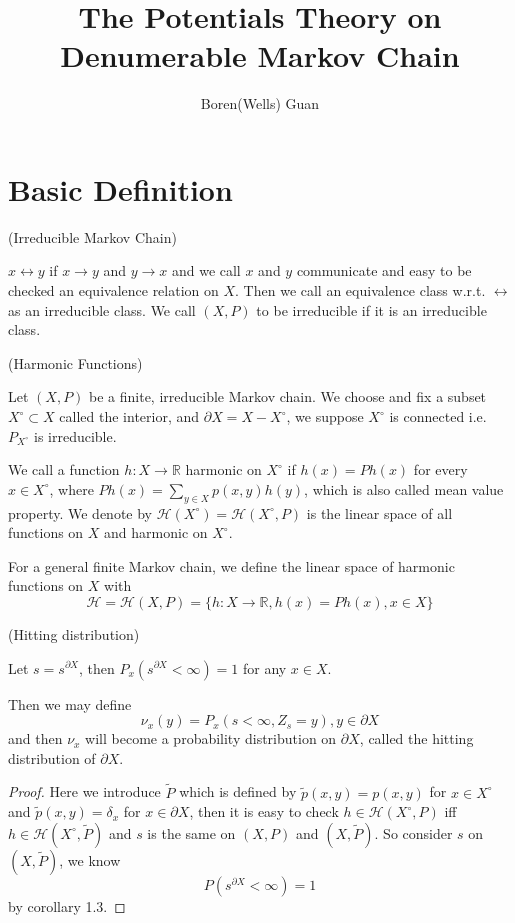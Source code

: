 \documentclass[lang=en,11pt,a4paper,citestyle =authoryear]{elegantpaper}
\title{The Potentials Theory on Denumerable Markov Chain}
\author{Boren(Wells) Guan}
\newcommand{\R}{\mathbb{R}}
\newcommand{\Har}{\mathcal{H}}
\begin{document}
\maketitle

\section{Basic Definition}

\begin{definition}
    (Irreducible Markov Chain)\par
    $x \leftrightarrow y$ if $x\to y$ and $y\to x$ and we call $x$ and $y$ communicate and easy to be checked an equivalence relation on $X$. Then we call an equivalence class w.r.t. $\leftrightarrow$ as an irreducible class. We call $(X,P)$ to be irreducible if it is an irreducible class.   
\end{definition}

\begin{definition}
    (Harmonic Functions)\par
    Let $(X,P)$ be a finite, irreducible Markov chain. We choose and fix a subset $X^{\circ} \subset X$ called the interior, and $\partial X = X - X^{\circ}$, we suppose $X^{\circ}$ is connected i.e. $P_{X^{\circ}}$ is irreducible.\par
    We call a function $h:X\to \R$ harmonic on $X^{\circ}$ if $h(x) = Ph(x)$ for every $x\in X^{\circ}$, where $Ph(x) = \sum\limits_{y \in X}p(x,y)h(y)$, which is also called mean value property. We denote by $\Har(X^{\circ}) = \Har(X^{\circ}, P)$ is the linear space of all functions on $X$ and harmonic on $X^{\circ}$.\par
    For a general finite Markov chain, we define the linear space of harmonic functions on $X$ with
    \[\Har = \Har(X,P) = \{h:X\to\R, h(x) = Ph(x), x\in X\}\]
\end{definition}

\begin{definition}
    (Hitting distribution)\par
    Let $s = s^{\partial X}$, then $P_x(s^{\partial X} < \infty) = 1$ for any $x\in X$.\par
    Then we may define
    \[\nu_x(y)  = P_x(s<\infty, Z_s = y), y\in\partial X\]
    and then $\nu_x$ will become a probability distribution on $\partial X$, called the hitting distribution of $\partial X$.
\end{definition}
\begin{proof}
    Here we introduce $\tilde{P}$ which is defined by $\tilde{p}(x,y) = p(x,y)$ for $x\in X^{\circ}$ and $\tilde{p}(x,y) = \delta_x$ for $x\in\partial X$, then it is easy to check $h\in \Har(X^{\circ},P)$ iff $h\in \Har(X^{\circ},\tilde{P})$ and $s$ is the same on $(X,P)$ and $(X,\tilde{P})$. So consider $s$ on $(X,\tilde{P})$, we know
    \[P(s^{\partial X} < \infty) = 1\]
    by corollary 1.3.
\end{proof}
\end{document}
